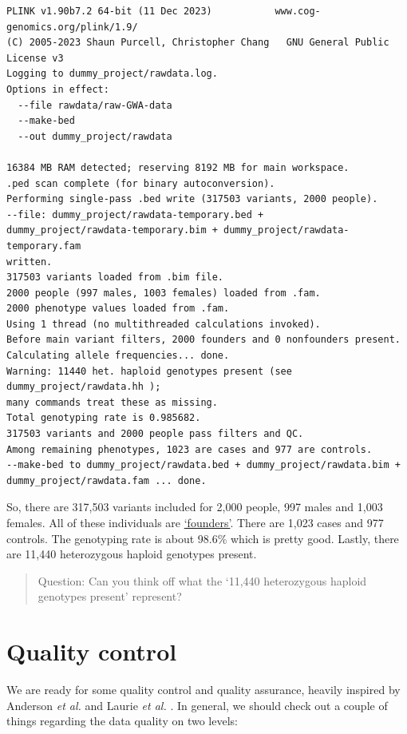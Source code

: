 \documentclass[
]{book}
\begin{document}
\begin{lstlisting}
PLINK v1.90b7.2 64-bit (11 Dec 2023)           www.cog-genomics.org/plink/1.9/
(C) 2005-2023 Shaun Purcell, Christopher Chang   GNU General Public License v3
Logging to dummy_project/rawdata.log.
Options in effect:
  --file rawdata/raw-GWA-data
  --make-bed
  --out dummy_project/rawdata

16384 MB RAM detected; reserving 8192 MB for main workspace.
.ped scan complete (for binary autoconversion).
Performing single-pass .bed write (317503 variants, 2000 people).
--file: dummy_project/rawdata-temporary.bed +
dummy_project/rawdata-temporary.bim + dummy_project/rawdata-temporary.fam
written.
317503 variants loaded from .bim file.
2000 people (997 males, 1003 females) loaded from .fam.
2000 phenotype values loaded from .fam.
Using 1 thread (no multithreaded calculations invoked).
Before main variant filters, 2000 founders and 0 nonfounders present.
Calculating allele frequencies... done.
Warning: 11440 het. haploid genotypes present (see dummy_project/rawdata.hh );
many commands treat these as missing.
Total genotyping rate is 0.985682.
317503 variants and 2000 people pass filters and QC.
Among remaining phenotypes, 1023 are cases and 977 are controls.
--make-bed to dummy_project/rawdata.bed + dummy_project/rawdata.bim +
dummy_project/rawdata.fam ... done.
\end{lstlisting}

So, there are 317,503 variants included for 2,000 people, 997 males and 1,003 females. All of these individuals are \href{https://www.cog-genomics.org/plink/1.9/filter\#nonfounders}{`founders'}. There are 1,023 cases and 977 controls. The genotyping rate is about 98.6\% which is pretty good. Lastly, there are 11,440 heterozygous haploid genotypes present.

\begin{quote}
Question: Can you think off what the `11,440 heterozygous haploid genotypes present' represent?
\end{quote}

\hypertarget{quality-control}{%
\section{Quality control}\label{quality-control}}

We are ready for some quality control and quality assurance, heavily inspired by Anderson \emph{et al.} \citep{anderson2010} and Laurie \emph{et al.} \citep{laurie2010}. In general, we should check out a couple of things regarding the data quality on two levels:
\end{document}
